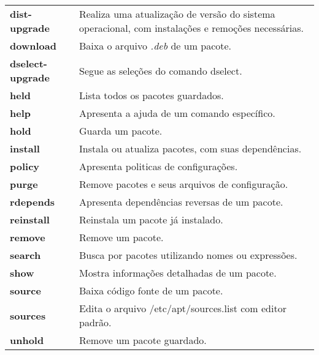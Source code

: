 \begin{longtable}{lm{11cm}}
	\rowcolor[gray]{0.8}
	\textbf{\code dist-upgrade} & Realiza uma atualização de versão do sistema operacional, com instalações e remoções necessárias. \\ %
	\textbf{\code download} & Baixa o arquivo \textit{.deb} de um pacote. \\ %
	\rowcolor[gray]{0.8}
	\textbf{\code dselect-upgrade} & Segue as seleções do comando {\code dselect}. \\ %
	\textbf{\code held} & Lista todos os pacotes guardados. \\ %
	\rowcolor[gray]{0.8}
	\textbf{\code help} & Apresenta a ajuda de um comando específico. \\ %
	\textbf{\code hold} & Guarda um pacote. \\ %
	\rowcolor[gray]{0.8}
	\textbf{\code install} & Instala ou atualiza pacotes, com suas dependências. \\ %
	\textbf{\code policy} & Apresenta politicas de configurações. \\ %
	\rowcolor[gray]{0.8}
	\textbf{\code purge} & Remove pacotes e seus arquivos de configuração. \\ %
	\textbf{\code rdepends} & Apresenta dependências reversas de um pacote. \\ %
	\rowcolor[gray]{0.8}
	\textbf{\code reinstall} & Reinstala um pacote já instalado. \\ %
	\textbf{\code remove} & Remove um pacote. \\ %
	\rowcolor[gray]{0.8}
	\textbf{\code search} & Busca por pacotes utilizando nomes ou expressões. \\ %
	\textbf{\code show} & Mostra informações detalhadas de um pacote. \\ %
	\rowcolor[gray]{0.8}
	\textbf{\code source} & Baixa código fonte de um pacote. \\ %
	\textbf{\code sources} & Edita o arquivo {\code /etc/apt/sources.list} com editor padrão. \\ %
	\rowcolor[gray]{0.8}
	\textbf{\code unhold} & Remove um pacote guardado. \\ %

\end{longtable}
